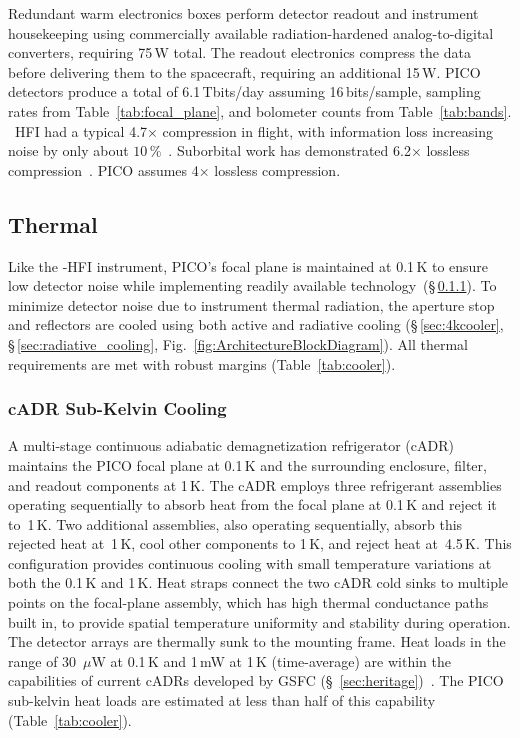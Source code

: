 Redundant warm electronics boxes perform detector readout and instrument housekeeping using commercially available radiation-hardened analog-to-digital converters, requiring 75\,W total. The readout electronics compress the data before delivering them to the spacecraft, requiring an additional 15\,W. PICO detectors produce a total of 6.1\,Tbits/day assuming 16\,bits/sample, sampling rates from Table~\ref{tab:focal_plane}, and bolometer counts from Table~\ref{tab:bands}. \planck \ HFI had a typical 4.7$\times$ compression in flight, with information loss increasing noise by only about $10\,\%$~\citep{Pajot2018,PlanckHFI2011}. Suborbital work has demonstrated 6.2$\times$ lossless compression~\citep{EBEX2017}. PICO assumes 4$\times$ lossless compression.

\subsection{Thermal}
\label{sec:thermal} %

Like the \planck -HFI instrument, PICO's focal plane is maintained at 0.1\,K to ensure low detector noise while implementing readily available technology~(\S\,\ref{sec:cadr}). To minimize detector noise due to instrument thermal radiation, the aperture stop and reflectors are cooled using both active and radiative cooling (\S\,\ref{sec:4kcooler}, \S\,\ref{sec:radiative_cooling}, Fig.~\ref{fig:ArchitectureBlockDiagram}).  All thermal requirements are met with robust margins (Table~\ref{tab:cooler}).



\subsubsection{cADR Sub-Kelvin Cooling}
\label{sec:cadr} %

A multi-stage continuous adiabatic demagnetization refrigerator (cADR) maintains the PICO focal plane at 0.1\,K and the surrounding enclosure, filter, and readout components at 1\,K. The cADR employs three refrigerant assemblies operating sequentially to absorb heat from the focal plane at 0.1\,K and reject it to~1\,K. Two additional assemblies, also operating sequentially, absorb this rejected heat at~1\,K, cool other components to 1\,K, and reject heat at~4.5\,K. This configuration provides continuous cooling with small temperature variations at both the 0.1\,K and 1\,K. Heat straps connect the two cADR cold sinks to multiple points on the focal-plane assembly,
which has high thermal conductance paths built in, to provide spatial temperature uniformity and stability during operation. The detector arrays are thermally sunk to the mounting frame.  Heat loads in the range of 30~$\mu$W at 0.1\,K and 1\,mW at 1\,K (time-average) are within the capabilities of current cADRs developed by GSFC (\S~\ref{sec:heritage})~\citep{Shirron2012,Shirron2016}. The PICO sub-kelvin heat loads are estimated at less than half of this capability (Table~\ref{tab:cooler}).

